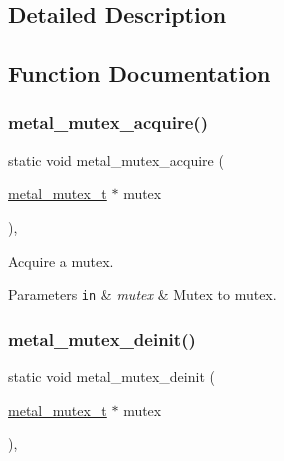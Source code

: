\subsection{Detailed Description}


\subsection{Function Documentation}
\mbox{\label{group__mutex_ga2ac9a9458e5d2b2d666c0a2c02e68bba}} 
\subsubsection{\texorpdfstring{metal\+\_\+mutex\+\_\+acquire()}{metal\_mutex\_acquire()}}
{\footnotesize\ttfamily static void metal\+\_\+mutex\+\_\+acquire (\begin{DoxyParamCaption}\item[{\hyperlink{structmetal__mutex__t}{metal\+\_\+mutex\+\_\+t} $\ast$}]{mutex }\end{DoxyParamCaption})\hspace{0.3cm}{\ttfamily [inline]}, {\ttfamily [static]}}



Acquire a mutex. 


\begin{DoxyParams}[1]{Parameters}
\mbox{\tt in}  & {\em mutex} & Mutex to mutex. \\
\hline
\end{DoxyParams}
\mbox{\label{group__mutex_ga641fc96da84389981f866bb14356b6f1}} 
\subsubsection{\texorpdfstring{metal\+\_\+mutex\+\_\+deinit()}{metal\_mutex\_deinit()}}
{\footnotesize\ttfamily static void metal\+\_\+mutex\+\_\+deinit (\begin{DoxyParamCaption}\item[{\hyperlink{structmetal__mutex__t}{metal\+\_\+mutex\+\_\+t} $\ast$}]{mutex }\end{DoxyParamCaption})\hspace{0.3cm}{\ttfamily [inline]}, {\ttfamily [static]}}



